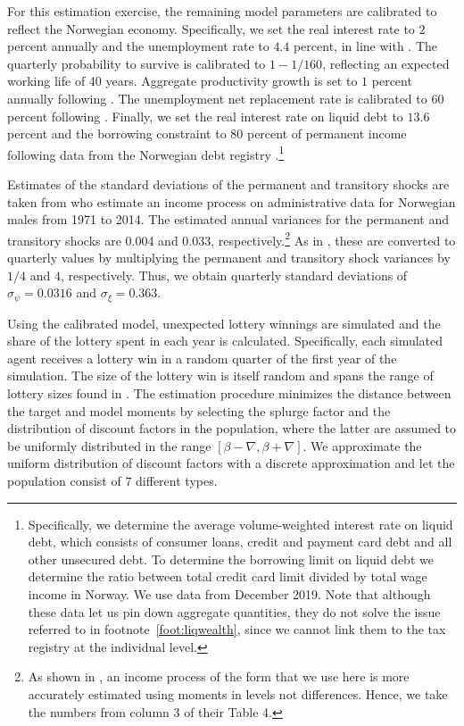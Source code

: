 \documentclass[../HAFiscal]{subfiles}
\begin{document}
For this estimation exercise, the remaining model parameters are calibrated to reflect the Norwegian economy. Specifically, we set the real interest rate to $2$ percent annually and the unemployment rate to $4.4$ percent, in line with \citet{aursland_state-dependent_2020}. The quarterly probability to survive is calibrated to $1-1/160$, reflecting an expected working life of 40 years. Aggregate productivity growth is set to $1$ percent annually following \citet{kravik_navigating_2019}. The unemployment net replacement rate is calibrated to $60$ percent following \citet{oecd_net_2020}. Finally, we set the real interest rate on liquid debt to $13.6$ percent and the borrowing constraint to $80$ percent of permanent income following data from the Norwegian debt registry \citet{gjeldsregistret_nokkeltall_2022}.\footnote{Specifically, we determine the average volume-weighted interest rate on liquid debt, which consists of consumer loans, credit and payment card debt and all other unsecured debt. To determine the borrowing limit on liquid debt we determine the ratio between total credit card limit divided by total wage income in Norway. We use data from December 2019. Note that although these data let us pin down aggregate quantities, they do not solve the issue referred to in footnote~\ref{foot:liqwealth}, since we cannot link them to the tax registry at the individual level.}

Estimates of the standard deviations of the permanent and transitory shocks are taken from \citet{crawley2022parsimonious} who estimate an income process on administrative data for Norwegian males from 1971 to 2014. The estimated annual variances for the permanent and transitory shocks are 0.004 and 0.033, respectively.\footnote{As shown in \citet{crawley2022parsimonious}, an income process of the form that we use here is more accurately estimated using moments in levels not differences. Hence, we take the numbers from column 3 of their Table 4.} As in \citet{carroll2020sticky}, these are converted to quarterly values by multiplying the permanent and transitory shock variances by $1/4$ and $4$, respectively. Thus, we obtain quarterly standard deviations of $\sigma_\psi=0.0316$ and $\sigma_\xi=0.363$.

Using the calibrated model, unexpected lottery winnings are simulated and the share of the lottery spent in each year is calculated. Specifically, each simulated agent receives a lottery win in a random quarter of the first year of the simulation. The size of the lottery win is itself random and spans the range of lottery sizes found in \citet{fagereng_mpc_2021}. The estimation procedure minimizes the distance between the target and model moments by selecting the splurge factor and the distribution of discount factors in the population, where the latter are assumed to be uniformly distributed in the range $[\beta-\nabla, \beta+\nabla]$. We approximate the uniform distribution of discount factors with a discrete approximation and let the population consist of $7$ different types.
\end{document}
